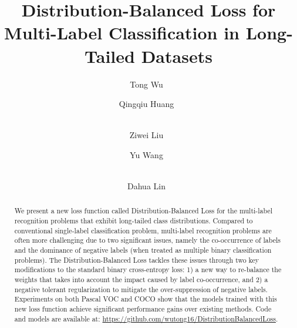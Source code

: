 \documentclass[runningheads]{llncs}
\begin{document}
\pagestyle{headings}
\mainmatter
\def\ECCVSubNumber{1631}  

\title{Distribution-Balanced Loss for Multi-Label Classification in Long-Tailed Datasets} 

\begin{comment}
\titlerunning{ECCV-20 submission ID \ECCVSubNumber} 
\authorrunning{ECCV-20 submission ID \ECCVSubNumber} 
\author{Anonymous ECCV submission}
\institute{Paper ID \ECCVSubNumber}
\end{comment}


\author{Tong Wu~ \and
Qingqiu Huang~ \and \\
Ziwei Liu~ \and
Yu Wang~ \and \\
Dahua Lin~}
 
\maketitle 

\begin{abstract}
    We present a new loss function called Distribution-Balanced Loss for the multi-label recognition problems that exhibit long-tailed class distributions. Compared to conventional single-label classification problem, multi-label recognition problems are often more challenging due to two significant issues, namely the co-occurrence of labels and the dominance of negative labels (when treated as multiple binary classification problems). The Distribution-Balanced Loss tackles these issues through two key modifications to the standard binary cross-entropy loss: 1) a new way to re-balance the weights that takes into account the impact caused by label co-occurrence, and 2) a negative tolerant regularization to mitigate the over-suppression of negative labels. Experiments on both Pascal VOC and COCO show that the models trained with this new loss function achieve significant performance gains over existing methods. Code and models are available at: \url{https://github.com/wutong16/DistributionBalancedLoss}. 

\end{abstract} 
\end{document}
